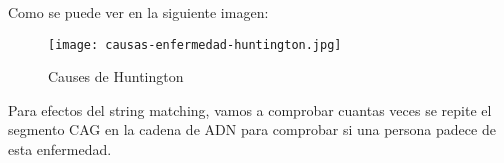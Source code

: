 Como se puede ver en la siguiente imagen: 
\begin{figure} [H]
\texttt{[image: causas-enfermedad-huntington.jpg]}
\caption{Causes de Huntington}
\label{fig:Hunttington}
\end{figure}


\quad Para efectos del string matching, vamos a comprobar cuantas veces se repite  el segmento CAG en la cadena de ADN para comprobar si una persona padece de esta enfermedad.



